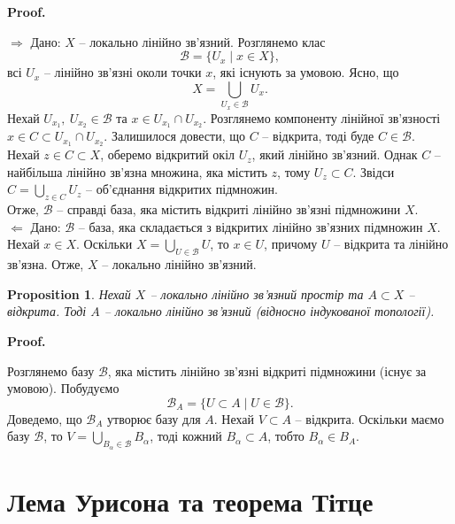 \documentclass[a4paper, 10pt]{article}
\makeatletter
\def\rightproof{$\boxed{\Rightarrow}$ }
\def\leftproof{$\boxed{\Leftarrow}$ }
\theoremstyle{theoremdd}
\newtheorem{proposition}[theorem]{Proposition}
\renewenvironment{proof}[1][Proof.\\]{\par
\pushQED{\hfill \qed}%
\normalfont \topsep6\p@\@plus6\p@\relax
\trivlist
\item\relax
{\bfseries
#1\@addpunct{.}}\hspace\labelsep\ignorespaces
}{%
\popQED\endtrivlist\@endpefalse
}
\makeatother
\begin{document}
\begin{proof}
\rightproof Дано: $X$ -- локально лінійно зв'язний. Розглянемо клас
\[
\mathcal{B} = \{ U_x \mid x \in X \},
\]
всі $U_x$ -- лінійно зв'язні околи точки $x$, які існують за умовою. Ясно, що
\[
X = \bigcup_{U_x \in \mathcal{B}} U_x.
\]
Нехай $U_{x_1},\ U_{x_2} \in \mathcal{B}$ та $x \in U_{x_1} \cap U_{x_2}$. Розглянемо компоненту лінійної зв'язності $x \in C \subset U_{x_1} \cap U_{x_2}$. Залишилося довести, що $C$ -- відкрита, тоді буде $C \in \mathcal{B}$.\\
Нехай $z \in C \subset X$, оберемо відкритий окіл $U_z$, який лінійно зв'язний. Однак $C$ -- найбільша лінійно зв'язна множина, яка містить $z$, тому $U_z \subset C$. Звідси $C = \displaystyle\bigcup_{z \in C} U_z$ -- об'єднання відкритих підмножин.\\
Отже, $\mathcal{B}$ -- справді база, яка містить відкриті лінійно зв'язні підмножини $X$.
\bigskip \\
\leftproof Дано: $\mathcal{B}$ -- база, яка складається з відкритих лінійно зв'язних підмножин $X$. Нехай $x \in X$. Оскільки $X = \displaystyle\bigcup_{U \in \mathcal{B}} U$, то $x \in U$, причому $U$ -- відкрита та лінійно зв'язна. Отже, $X$ -- локально лінійно зв'язний.
\end{proof}

\begin{proposition}
Нехай $X$ -- локально лінійно зв'язний простір та $A \subset X$ -- відкрита. Тоді $A$ -- локально лінійно зв'язний (відносно індукованої топології).
\end{proposition}

\begin{proof}
Розглянемо базу $\mathcal{B}$, яка містить лінійно зв'язні відкриті підмножини (існує за умовою). Побудуємо
\[
\mathcal{B}_A = \{ U \subset A \mid U \in \mathcal{B} \}.
\]
Доведемо, що $\mathcal{B}_A$ утворює базу для $A$. Нехай $V \subset A$ -- відкрита. Оскільки маємо базу $\mathcal{B}$, то $V = \displaystyle\bigcup_{B_\alpha \in \mathcal{B}} B_\alpha$, тоді кожний $B_\alpha \subset A$, тобто $B_\alpha \in B_A$.
\end{proof}

\newpage

\section{Лема Урисона та теорема Тітце}
\end{document}
